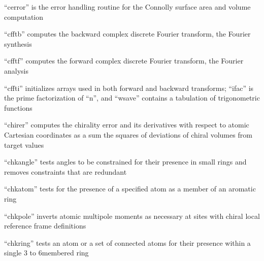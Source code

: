 \documentclass[letterpaper,11pt,english]{sphinxmanual}
\begin{document}
\sphinxAtStartPar
{}

\sphinxAtStartPar
“cerror” is the error handling routine for the Connolly surface area and volume computation

\sphinxAtStartPar
{}

\sphinxAtStartPar
“cfftb” computes the backward complex discrete Fourier transform, the Fourier synthesis

\sphinxAtStartPar
{}

\sphinxAtStartPar
{}

\sphinxAtStartPar
“cfftf” computes the forward complex discrete Fourier transform, the Fourier analysis

\sphinxAtStartPar
{}

\sphinxAtStartPar
{}

\sphinxAtStartPar
“cffti” initializes arrays used in both forward and backward transforms; “ifac” is the prime factorization of “n”, and “wsave” contains a tabulation of trigonometric functions

\sphinxAtStartPar
{}

\sphinxAtStartPar
{}

\sphinxAtStartPar
“chirer” computes the chirality error and its derivatives with respect to atomic Cartesian coordinates as a sum the squares of deviations of chiral volumes from target values

\sphinxAtStartPar
{}

\sphinxAtStartPar
“chkangle” tests angles to be constrained for their presence
in small rings and removes constraints that are redundant

\sphinxAtStartPar
{}

\sphinxAtStartPar
“chkatom” tests for the presence of a specified atom as a member of an aromatic ring

\sphinxAtStartPar
{}

\sphinxAtStartPar
“chkpole” inverts atomic multipole moments as necessary at sites with chiral local reference frame definitions

\sphinxAtStartPar
{}

\sphinxAtStartPar
“chkring” tests an atom or a set of connected atoms for their presence within a single 3\sphinxhyphen{} to 6\sphinxhyphen{}membered ring
\end{document}
